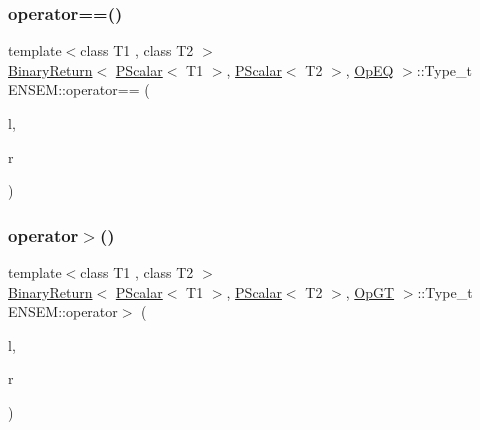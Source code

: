 \mbox{\label{group__primscalar_ga2834c2d31221ad19c3251f77a4b404f4}} 
\subsubsection{\texorpdfstring{operator==()}{operator==()}}
{\footnotesize\ttfamily template$<$class T1 , class T2 $>$ \\
\mbox{\hyperlink{structENSEM_1_1BinaryReturn}{Binary\+Return}}$<$ \mbox{\hyperlink{classENSEM_1_1PScalar}{P\+Scalar}}$<$ T1 $>$, \mbox{\hyperlink{classENSEM_1_1PScalar}{P\+Scalar}}$<$ T2 $>$, \mbox{\hyperlink{structENSEM_1_1OpEQ}{Op\+EQ}} $>$\+::Type\+\_\+t E\+N\+S\+E\+M\+::operator== (\begin{DoxyParamCaption}\item[{const \mbox{\hyperlink{classENSEM_1_1PScalar}{P\+Scalar}}$<$ T1 $>$ \&}]{l,  }\item[{const \mbox{\hyperlink{classENSEM_1_1PScalar}{P\+Scalar}}$<$ T2 $>$ \&}]{r }\end{DoxyParamCaption})\hspace{0.3cm}{\ttfamily [inline]}}

\mbox{\label{group__primscalar_gac4bbd6e76f1d5dfb8c50417f131c43a0}} 
\subsubsection{\texorpdfstring{operator$>$()}{operator>()}}
{\footnotesize\ttfamily template$<$class T1 , class T2 $>$ \\
\mbox{\hyperlink{structENSEM_1_1BinaryReturn}{Binary\+Return}}$<$ \mbox{\hyperlink{classENSEM_1_1PScalar}{P\+Scalar}}$<$ T1 $>$, \mbox{\hyperlink{classENSEM_1_1PScalar}{P\+Scalar}}$<$ T2 $>$, \mbox{\hyperlink{structENSEM_1_1OpGT}{Op\+GT}} $>$\+::Type\+\_\+t E\+N\+S\+E\+M\+::operator$>$ (\begin{DoxyParamCaption}\item[{const \mbox{\hyperlink{classENSEM_1_1PScalar}{P\+Scalar}}$<$ T1 $>$ \&}]{l,  }\item[{const \mbox{\hyperlink{classENSEM_1_1PScalar}{P\+Scalar}}$<$ T2 $>$ \&}]{r }\end{DoxyParamCaption})\hspace{0.3cm}{\ttfamily [inline]}}

